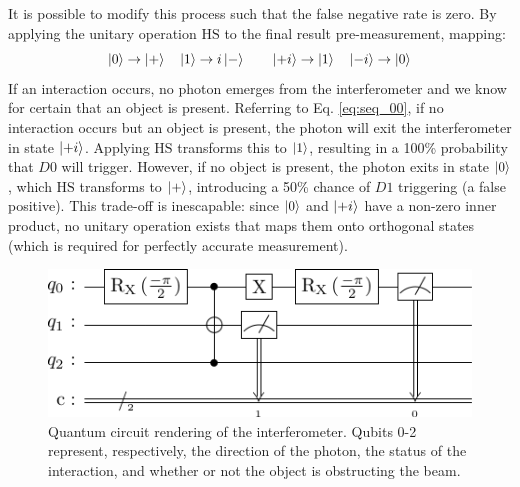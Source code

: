 \documentclass{article}
\newcommand{\Hgt}{\text{H}}
\newcommand{\Sgt}{\text{S}}
\begin{document}
It is possible to modify this process such that the false negative rate is zero. By applying the unitary operation $\Hgt\Sgt$ to the final result pre-measurement, mapping:
$$\ket 0 \to \ket + \quad \ket 1 \to i \ket - \qquad \ket{+i} \to \ket 1 \quad \ket{-i} \to \ket 0$$
If an interaction occurs, no photon emerges from the interferometer and we know for certain that an object is present. Referring to Eq. \ref{eq:seq_00}, if no interaction occurs but an object is present, the photon will exit the interferometer in state $\ket{+i}$. Applying $\Hgt\Sgt$ transforms this to $\ket 1$, resulting in a 100\% probability that $D0$ will trigger. However, if no object is present, the photon exits in state $\ket 0$, which $\Hgt\Sgt$ transforms to $\ket +$, introducing a 50\% chance of $D1$ triggering (a false positive). This trade-off is inescapable: since $\ket 0$ and $\ket{+i}$ have a non-zero inner product, no unitary operation exists that maps them onto orthogonal states (which is required for perfectly accurate measurement).

\begin{figure}
\includegraphics[scale=0.5]{circuit-render}
\centering
\caption{Quantum circuit rendering of the interferometer. Qubits 0-2 represent, respectively, the direction of the photon, the status of the interaction, and whether or not the object is obstructing the beam.}
\label{fig:circuit-render}
\end{figure}
\end{document}
